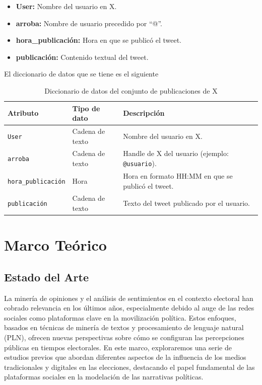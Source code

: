 \documentclass[10pt, a4paper]{article}
\begin{document}
	\begin{itemize}
		\item \textbf{User:} Nombre del usuario en X.
		\item \textbf{arroba:} Nombre de usuario precedido por ``@''.
		\item \textbf{hora\_publicación:} Hora en que se publicó el tweet.
		\item \textbf{publicación:} Contenido textual del tweet.
	\end{itemize}
	
	El diccionario de datos que se tiene es el siguiente
	
	\begin{table}[h]
		\centering
		\begin{tabular}{llp{9cm}}
			\hline
			\textbf{Atributo} & \textbf{Tipo de dato} & \textbf{Descripción} \\
			\hline
			\texttt{User} & Cadena de texto & Nombre del usuario en X. \\
			\texttt{arroba} & Cadena de texto & Handle de X del usuario (ejemplo: \texttt{@usuario}). \\
			\texttt{hora\_publicación} & Hora & Hora en formato HH:MM en que se publicó el tweet. \\
			\texttt{publicación} & Cadena de texto & Texto del tweet publicado por el usuario. \\
			\hline
		\end{tabular}
		\caption{Diccionario de datos del conjunto de publicaciones de X}
	\end{table}  
	
	
	\section{Marco Teórico}
	
	\subsection{Estado del Arte}
	La minería de opiniones y el análisis de sentimientos en el contexto electoral han cobrado relevancia en los últimos años, especialmente debido al auge de las redes sociales como plataformas clave en la movilización política. Estos enfoques, basados en técnicas de minería de textos y procesamiento de lenguaje natural (PLN), ofrecen nuevas perspectivas sobre cómo se configuran las percepciones públicas en tiempos electorales. En este marco, exploraremos una serie de estudios previos que abordan diferentes aspectos de la influencia de los medios tradicionales y digitales en las elecciones, destacando el papel fundamental de las plataformas sociales en la modelación de las narrativas políticas.
	
\end{document}
